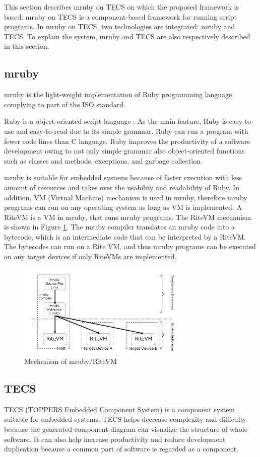 \documentclass[conference,compsoc]{IEEEtran}
\begin{document}
This section describes mruby on TECS on which the proposed framework is based.
mruby on TECS is a component-based framework for running script programs.
In mruby on TECS, two technologies are integrated: mruby and TECS.
To explain the system, mruby and TECS are also respectively described in this section.

\subsection{mruby}
\label{sec:mruby}
mruby is the light-weight implementation of Ruby programming language complying to part of the ISO standard.

Ruby is a object-oriented script language \cite{url:Ruby}.
As the main feature, Ruby is easy-to-use and easy-to-read due to its simple grammar.
Ruby can run a program with fewer code lines than C language.
Ruby improves the productivity of a software development owing to not only simple grammar also object-oriented functions such as classes and methods, exceptions, and garbage collection.

mruby is suitable for embedded systems because of faster execution with less amount of resources and takes over the usability and readability of Ruby.
In addition, VM (Virtual Machine) mechanism is used in mruby, therefore mruby programs can run on any operating system as long as VM is implemented.
A RiteVM is a VM in mruby, that runs mruby programs.
The RiteVM mechanism is shown in Figure \ref{fig:mruby}.
The mruby compiler translates an mruby code into a bytecode, which is an intermediate code that can be interpreted by a RiteVM.
The bytecodes can run on a Rite VM, and thus mruby programs can be executed on any target devices if only RiteVMs are implemented.
\begin{figure}[t]
    \centering
    \includegraphics[width=8cm,clip]{figure/mruby.pdf}
    \caption{Mechanism of mruby/RiteVM}
    \label{fig:mruby}
\end{figure}

\subsection{TECS}
\label{sec:TECS}
TECS (TOPPERS Embedded Component System) is a component system suitable for embedded systems.
TECS helps decrease complexity and difficulty because the generated component diagram can visualize the structure of whole software.
It can also help increase productivity and reduce development duplication  because a common part of software is regarded as a component.
\end{document}
